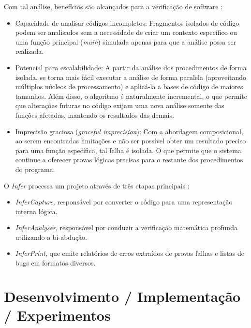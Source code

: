 \documentclass[
    12pt,                %
    openright,           %
    oneside,             %
    a4paper,             %
    english,             %
    brazil               %
]{abntex2}
\begin{document}
\par 
Com tal análise, benefícios são alcançados para a verificação de software \cite{Infer2011}:
\begin{itemize}
\item
Capacidade de analisar códigos incompletos: Fragmentos isolados de código podem ser analisados sem a necessidade de criar um contexto específico ou uma função principal (\textit{main}) simulada apenas para que a análise possa ser realizada.

\item 
Potencial para escalabilidade: A partir da análise dos procedimentos de forma isolada, se torna mais fácil executar a análise de forma paralela (aproveitando múltiplos núcleos de processamento) e aplicá-la a bases de código de maiores tamanhos. Além disso, o algoritmo é naturalmente incremental, o que permite que alterações futuras no código exijam uma nova análise somente das funções afetadas, mantendo os resultados das demais.

\item
Imprecisão graciosa (\textit{graceful imprecision}): Com a abordagem composicional, ao serem encontradas limitações e não ser possível obter um resultado preciso para uma função específica, tal falha é isolada. O que permite que o sistema continue a oferecer provas lógicas precisas para o restante dos procedimentos do programa.
\end{itemize}

\par
O \textit{Infer} processa um projeto através de três etapas principais \cite{Infer2011}:
\begin{itemize}
\item \textit{InferCapture}, responsável por converter o código para uma representação interna lógica.
\item \textit{InferAnalyser}, responsável por conduzir a verificação matemática profunda utilizando a bi-abdução.
\item \textit{InferPrint}, que emite relatórios de erros extraídos de provas falhas e listas de bugs em formatos diversos.
\end{itemize}



\chapter{Desenvolvimento / Implementação / Experimentos}
\label{cap:desenvolvimento}
\end{document}
